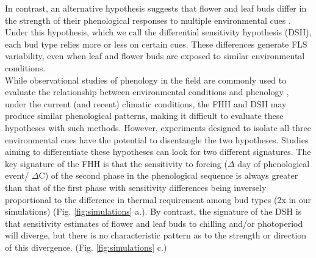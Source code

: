 \documentclass[11pt]{article}\usepackage[]{graphicx}\usepackage[]{color}
\begin{document}
\noindent In contrast, an alternative hypothesis suggests that flower and leaf buds differ in the strength of their phenological responses to multiple environmental cues \citep{Citadin2001,Gariglio2006,Aslani2009,Mehlenbacher:1991aa}. Under this hypothesis, which we call the differential sensitivity hypothesis (DSH), each bud type relies more or less on certain cues. These differences generate FLS variability, even when leaf and flower buds are exposed to similar environmental conditions.\\ %


\noindent While observational studies of phenology in the field are commonly used to evaluate the relationship between environmental conditions and phenology \citep{Cleland2007}, under the current (and recent) climatic conditions, the FHH and DSH may produce similar phenological patterns, making it difficult to evaluate these hypotheses with such methods. However, experiments designed to isolate all three environmental cues have the potential to disentangle the two hypotheses. Studies aiming to differentiate these hypotheses can look for two different signatures. The key signature of the FHH is that the sensitivity to forcing ($\Delta$ day of phenological event/ $\Delta$\degree C) of the second phase in the phenological sequence is always greater than that of the first phase with sensitivity differences being inversely proportional to the difference in thermal requirement among bud types (2x in our simulations) (Fig. \ref{fig:simulations} a.). By contrast, the signature of the DSH is that sensitivity estimates of flower and leaf buds to chilling and/or photoperiod will diverge, but there is no characteristic pattern as to the strength or direction of this divergence. (Fig. \ref{fig:simulations} c.)\\
\end{document}
